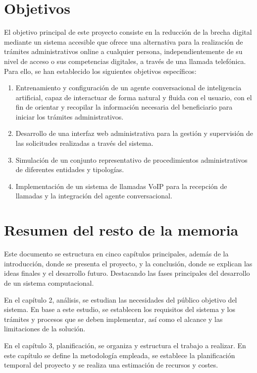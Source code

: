 \documentclass[12pt, a4paper, twoside]{report}
\begin{document}
    \section{Objetivos}
        El objetivo principal de este proyecto consiste en la reducción de la brecha digital mediante un sistema accesible que ofrece una alternativa para la realización de trámites administrativos online a cualquier persona, independientemente de su nivel de acceso o sus competencias digitales, a través de una llamada telefónica.
        Para ello, se han establecido los siguientes objetivos específicos:
        \begin{enumerate}
            \item Entrenamiento y configuración de un agente conversacional de inteligencia artificial, capaz de interactuar de forma natural y fluida con el usuario, con el fin de orientar y recopilar la información necesaria del beneficiario para iniciar los trámites administrativos.
            \item Desarrollo de una interfaz web administrativa para la gestión y supervisión de las solicitudes realizadas a través del sistema.
            \item Simulación de un conjunto representativo de procedimientos administrativos de diferentes entidades y tipologías.
            \item Implementación de un sistema de llamadas VoIP para la recepción de llamadas y la integración del agente conversacional.
        \end{enumerate}

    \section{Resumen del resto de la memoria}
        Este documento se estructura en cinco capítulos principales, además de la introducción, donde se presenta el proyecto, y la conclusión, donde se explican las ideas finales y el desarrollo futuro. 
        Destacando las fases principales del desarrollo de un sistema computacional.

        En el capítulo 2, análisis, se estudian las necesidades del público objetivo del sistema. 
        En base a este estudio, se establecen los requisitos del sistema y los trámites y procesos que se deben implementar, así como el alcance y las limitaciones de la solución.

        En el capítulo 3, planificación, se organiza y estructura el trabajo a realizar. 
        En este capítulo se define la metodología empleada, se establece la planificación temporal del proyecto y se realiza una estimación de recursos y costes.
        
\end{document}
